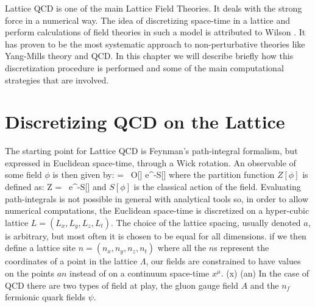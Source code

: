 
Lattice QCD is one of the main Lattice Field Theories. It deals with the strong force in a numerical way. The idea of discretizing space-time in a lattice and perform calculations of field theories in such a model is attributed to Wilson \CIT. It has proven to be the most systematic approach to non-perturbative theories like Yang-Mills theory and QCD. In this chapter we will describe briefly how this discretization procedure is performed and some of the main computational strategies that are involved.

\section{Discretizing QCD on the Lattice}
The starting point for Lattice QCD is Feynman's path-integral formalism, but expressed in Euclidean space-time, through a Wick rotation. An observable of some field $\phi$ is then given by:
\beq
	 =  \int \D[\phi] ~O[\phi] e^{-S[\phi]}
\eeq
where the partition function $Z[\phi]$ is defined as:
\beq
	Z = \int \D[\phi] ~e^{-S[\phi]} 
\eeq
and $S[\phi]$ is the classical action of the field. Evaluating path-integrals is not possible in general with analytical tools so, in order to allow numerical computations, the Euclidean space-time is discretized on a hyper-cubic lattice $L = (L_x, L_y, L_z, L_t)$. The choice of the lattice spacing, usually denoted $a$, is arbitrary, but most often it is chosen to be equal for all dimensions. if we then define a lattice site $n = (n_x, n_y, n_z, n_t)$ where all the $n$s represent the coordinates of a point in the lattice $\Lambda$, our fields are constrained to have values on the points $an$ instead of on a continuum space-time $x^\mu$.
\beq
    \phi(x)  \phi(an)
\eeq
In the case of QCD there are two types of field at play, the gluon gauge field $A$ and the $n_f$ fermionic quark fields $\psi$. 

